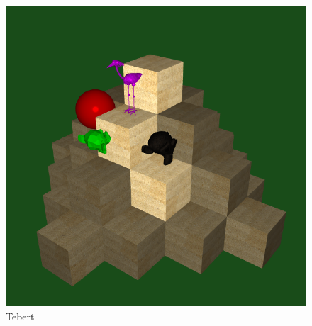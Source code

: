 \documentclass[12pt]{article}
\begin{document}
\begin{figure}[H]
  \centering
  \includegraphics[width=14cm]{tebert.png}
  \caption{Tebert}
  \label{fig:tb}
\end{figure}
\end{document}

